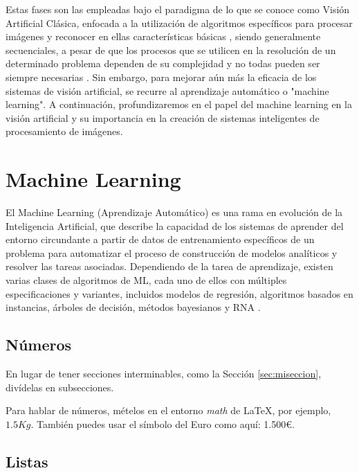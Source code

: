 Estas fases son las empleadas bajo el paradigma de lo que se conoce como Visión
Artificial Clásica, enfocada a la utilización de algoritmos específicos para procesar imágenes y reconocer en ellas características básicas \cite{Martinez22}, siendo generalmente secuenciales, a pesar de que los procesos que se utilicen en la resolución de un determinado problema dependen de su complejidad y no todas pueden ser siempre necesarias \cite{Santillan15}. Sin embargo, para mejorar aún más la eficacia de los sistemas de visión artificial, se recurre al aprendizaje automático o "machine learning". A continuación, profundizaremos en el papel del machine learning en la visión artificial y su importancia en la creación de sistemas inteligentes de procesamiento de imágenes. \\

\pagebreak

\section{Machine Learning}
\label{sec:MachineLearning} 

El Machine Learning (Aprendizaje Automático) es una rama en evolución de la Inteligencia Artificial, que describe la capacidad de los sistemas de aprender del entorno circundante a partir de datos de entrenamiento específicos de un problema para automatizar el proceso de construcción de modelos analíticos y resolver las tareas asociadas. Dependiendo de la tarea de aprendizaje, existen varias clases de algoritmos de ML, cada uno de ellos con múltiples especificaciones y variantes, incluidos modelos de regresión, algoritmos basados en instancias, árboles de decisión, métodos bayesianos y RNA \cite{Janiesch21}.


\subsection{Números}
\label{sec:subseccion}

En lugar de tener secciones interminables, como la Sección \ref{sec:miseccion}, divídelas en subsecciones.

Para hablar de números, mételos en el entorno \textit{math} de \LaTeX, por ejemplo, $1.5Kg$. También puedes usar el símbolo del Euro como aquí: 1.500\euro.

\subsection{Listas}

